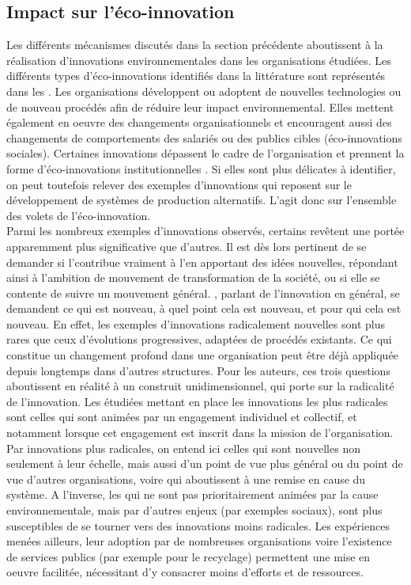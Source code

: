     \subsection{Impact sur l'éco-innovation}
        Les différents mécanismes discutés dans la section précédente aboutissent à la réalisation d'innovations environnementales dans les organisations étudiées. Les différents types d'éco-innovations identifiés dans la littérature sont représentés dans les \oess. Les organisations développent ou adoptent de nouvelles technologies ou de nouveau procédés afin de réduire leur impact environnemental. Elles mettent également en oeuvre des changements organisationnels et encouragent aussi des changements de comportements des salariés ou des publics cibles (éco-innovations sociales). Certaines innovations dépassent le cadre de l'organisation et prennent la forme d'éco-innovations institutionnelles \parencite{rennings2000redefining}. Si elles sont plus délicates à identifier, on peut toutefois relever des exemples d'innovations  \parencite{arundel2009measuring} qui reposent sur le développement de systèmes de production alternatifs. L'\ess agit donc sur l'ensemble des volets de l'éco-innovation.\\

        Parmi les nombreux exemples d'innovations observés, certains revêtent une portée apparemment plus significative que d'autres. Il est dès lors pertinent de se demander si l'\ess contribue vraiment à l'\ei en apportant des idées nouvelles, répondant ainsi à l'ambition de mouvement de transformation de la société, ou si elle se contente de suivre un mouvement général. \textcite{johannessen2001innovation}, parlant de l'innovation en général, se demandent ce qui est nouveau, à quel point cela est nouveau, et pour qui cela est nouveau. En effet, les exemples d'innovations radicalement nouvelles sont plus rares que ceux d'évolutions progressives, adaptées de procédés existants. Ce qui constitue un changement profond dans une organisation peut être déjà appliquée depuis longtemps dans d'autres structures. Pour les auteurs, ces trois questions aboutissent en réalité à un construit unidimensionnel, qui porte sur la radicalité de l'innovation. Les \oess étudiées mettant en place les innovations les plus radicales sont celles qui sont animées par un engagement individuel et collectif, et notamment lorsque cet engagement est inscrit dans la mission de l'organisation. Par innovations plus radicales, on entend ici celles qui sont nouvelles non seulement à leur échelle, mais aussi d'un point de vue plus général ou du point de vue d'autres organisations, voire qui aboutissent à une remise en cause du système. A l'inverse, les \eess qui ne sont pas prioritairement animées par la cause environnementale, mais par d'autres enjeux (par exemples sociaux), sont plus susceptibles de se tourner vers des innovations moins radicales. Les expériences menées ailleurs, leur adoption par de nombreuses organisations voire l'existence de services publics (par exemple pour le recyclage) permettent une mise en oeuvre facilitée, nécessitant d'y consacrer moins d'efforts et de ressources. \\

